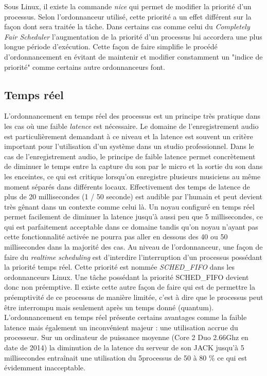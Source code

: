 \documentclass{article}
\begin{document}
Sous Linux, il existe la commande \emph{nice} qui permet de modifier la priorité d'un processus. Selon l'ordonnanceur utilisé, cette priorité a un effet différent sur la façon dont sera traitée la tâche. Dans certains cas comme celui du \emph{Completely Fair Scheduler} l'augmentation de la priorité d'un processus lui accordera une plus longue période d'exécution. Cette façon de faire simplifie le procédé d'ordonnancement en évitant de maintenir et modifier constamment un "indice de priorité" comme certains autre ordonnanceurs font.


\subsection{Temps réel}

L'ordonnancement en temps réel des processus est un principe très pratique dans les cas où une faible \emph{latence} est nécessaire. Le domaine de l'enregistrement audio est particulièrement demandant à ce niveau et la latence est souvent un critère important pour l'utilisation d'un système dans un studio professionnel.
\newline
\newline
Dans le cas de l'enregistrement audio, le principe de faible latence permet concrètement de diminuer le temps entre la capture du son par le micro et la sortie du son dans les enceintes, ce qui est critique lorsqu'on enregistre plusieurs musiciens au même moment séparés dans différents locaux. Effectivement des temps de latence de plus de 20 millisecondes (1 / 50 seconde) est audible par l'humain et peut devient très gênant dans un contexte comme celui là. Un noyau configuré en temps réel permet facilement de diminuer la latence jusqu'à aussi peu que 5 millisecondes, ce qui est parfaitement acceptable dans ce domaine tandis qu'on noyau n'ayant pas cette fonctionnalité activée ne pourra pas aller en dessous des 40 ou 50 millisecondes dans la majorité des cas. 
\newline
\newline
Au niveau de l'ordonnanceur, une façon de faire du \emph{realtime scheduling} est d'interdire l'interruption d'un processus possédant la priorité temps réel. Cette priorité est nommée \emph{SCHED\_FIFO} dans les ordonnanceurs Linux. Une tâche possédant la priorité SCHED\_FIFO devient donc non préemptive. Il existe cette autre façon de faire qui est de permettre la préemptivité de ce processus de manière limitée, c'est à dire que le processus peut être interrompu mais seulement après un temps donné (quantum).
\newline
\newline
L'ordonnancement en temps réel présente certains avantages comme la faible latence mais également un inconvénient majeur : une utilisation accrue du processeur. Sur un ordinateur de puissance moyenne (Core 2 Duo 2.66Ghz en date de 2014) la diminution de la latence du serveur de son JACK jusqu'à 5 millisecondes entraînait une utilisation du 5processus de 50 à 80  \% ce qui est évidemment inacceptable.
\newpage
\end{document}
